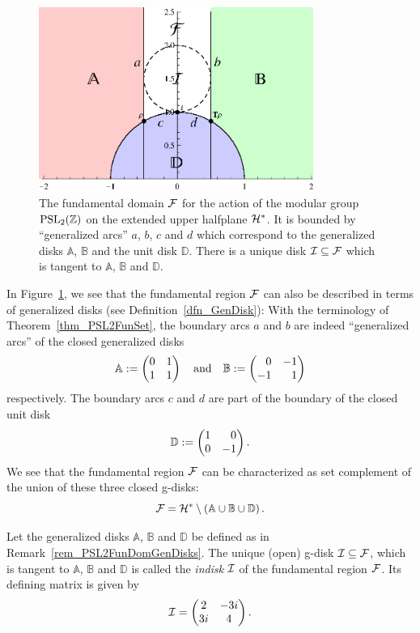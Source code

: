 \begin{remark}
\label{rem_PSL2FunDomGenDisks}
\begin{figure}
\centering
\includegraphics[width=0.8\textwidth]{figures/fundom}
\caption{The fundamental domain $\mathcal{F}$ for the action of the modular group $\operatorname{PSL}_{2}(\mathbb{Z})$ on the extended upper halfplane $\mathcal{H}^\ast$. It is bounded by ``generalized arcs'' $a$, $b$, $c$ and $d$ which correspond to the generalized disks $\mathbb{A}$, $\mathbb{B}$ and the unit disk $\mathbb{D}$. There is a unique disk $\mathcal{I} \subseteq \mathcal{F}$ which is tangent to $\mathbb{A}$, $\mathbb{B}$ and $\mathbb{D}$.}
\label{fig_PSL2FunDom}
\end{figure}
In Figure~\ref{fig_PSL2FunDom}, we see that the fundamental region $\mathcal{F}$ can also be described in terms of generalized disks (see Definition~\ref{dfn_GenDisk}): With the terminology of Theorem~\ref{thm_PSL2FunSet}, the boundary arcs $a$ and $b$ are indeed ``generalized arcs'' of the closed generalized disks
\begin{equation*}
\mathbb{A} := \begin{pmatrix}0 & 1 \\ 1 & 1\end{pmatrix} \quad \text{and} \quad \mathbb{B} := \begin{pmatrix}\phantom{+}0 & -1 \\ -1 & \phantom{+}1\end{pmatrix}
\end{equation*}
respectively. The boundary arcs $c$ and $d$ are part of the boundary of the closed unit disk
\begin{equation*}
\mathbb{D} := \begin{pmatrix}1 & \phantom{+}0 \\ 0 & -1\end{pmatrix}.
\end{equation*}
We see that the fundamental region $\mathcal{F}$ can be characterized as set complement of the union of these three closed g-disks:
\begin{equation}
\label{eqn_PSL2FunDomDiskComplement}
\mathcal{F} = \mathcal{H}^\ast \setminus \left(\mathbb{A} \cup \mathbb{B} \cup \mathbb{D}\right).
\end{equation}
\end{remark}

\begin{definition}
\label{dfn_PSL2Indisk}
Let the generalized disks $\mathbb{A}$, $\mathbb{B}$ and $\mathbb{D}$ be defined as in Remark~\ref{rem_PSL2FunDomGenDisks}. The unique (open) g-disk $\mathcal{I} \subseteq \mathcal{F}$, which is tangent to $\mathbb{A}$, $\mathbb{B}$ and $\mathbb{D}$ is called the \emph{indisk} $\mathcal{I}$ of the fundamental region $\mathcal{F}$. Its defining matrix is given by
\begin{equation}
\label{eqn_PSL2Indisk}
\mathcal{I} = \begin{pmatrix}2 & -3i \\ 3i & 4\end{pmatrix}.
\end{equation}
\end{definition}
